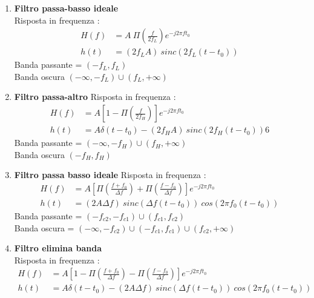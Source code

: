 \documentclass{article}
\theoremstyle{definition}
\begin{document}
\begin{enumerate}
	\item \textbf{Filtro passa-basso ideale} \\
	Risposta in frequenza : \begin{align*}
		H(f)&=A 	\ \Pi \left(\frac{f}{2f_L}\right)e^{-j2\pi f t_0} \\
		h(t)&= (2 f_L A) \ sinc(2f_L(t-t_0))
	\end{align*}
	Banda passante = $(-f_L,f_L)$\\
	Banda oscura $(-\infty,-f_L)\cup (f_L , + \infty)$ 
	\item \textbf{Filtro passa-altro}
	Risposta in frequenza : 
\begin{align*}
	H(f)&=A \left[1-\Pi \left(\frac{f}{2f_H}\right)\right]e^{-j2\pi f t_0} \\
	h(t)&=A \delta(t-t_0) - (2 f_H A) \ sinc(2f_H(t-t_0))6
\end{align*}
Banda passante = $(-\infty,-f_H)\cup (f_H , + \infty)$ \\
Banda oscura $(-f_H,f_H)$
\item \textbf{Filtro passa basso ideale}
Risposta in frequenza : 
\begin{align*}
H(f)&=A \left[\Pi \left(\frac{f+f_0}{\Delta f}\right)+\Pi \left(\frac{f-f_0}{\Delta f}\right)\right]e^{-j2\pi f t_0} \\
h(t)&= (2 A \Delta f ) \ sinc (\Delta f (t-t_0)) \ cos(2 \pi f_0 (t-t_0))
\end{align*}
Banda passante = $(-f_{c2},-f_{c1})\cup (f_{c1},f_{c2})$\\
Banda oscura = $(-\infty ,-f_{c2})\cup (-f_{c1},f_{c1}) \cup (f_{c2},+\infty)$
\item \textbf{Filtro elimina banda} \\
Risposta in frequenza : 
\begin{align*}
	H(f)&=A \left[1 - \Pi \left(\frac{f+f_0}{\Delta f}\right)-\Pi \left(\frac{f-f_0}{\Delta f}\right)\right]e^{-j2\pi f t_0} \\
	h(t)&= A\delta (t-t_0)- (2 A \Delta f ) \ sinc (\Delta f (t-t_0)) \ cos(2 \pi f_0 (t-t_0))
\end{align*}


\end{enumerate}






\newpage 
\end{document}
